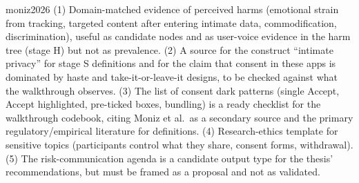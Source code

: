 \begin{papercard}{moniz2026}
 (1) Domain-matched evidence of perceived harms (emotional strain from tracking, targeted content after entering intimate data, commodification, discrimination), useful as candidate nodes and as user-voice evidence in the harm tree (stage H) but not as prevalence. (2) A source for the construct ``intimate privacy'' for stage S definitions and for the claim that consent in these apps is dominated by haste and take-it-or-leave-it designs, to be checked against what the walkthrough observes. (3) The list of consent dark patterns (single Accept, Accept highlighted, pre-ticked boxes, bundling) is a ready checklist for the walkthrough codebook, citing Moniz et al.\ as a secondary source and the primary regulatory/empirical literature for definitions. (4) Research-ethics template for sensitive topics (participants control what they share, consent forms, withdrawal). (5) The risk-communication agenda is a candidate output type for the thesis' recommendations, but must be framed as a proposal and not as validated.
\end{papercard}
